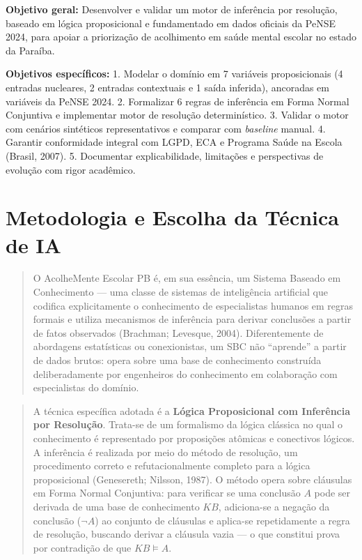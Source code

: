\documentclass[11pt]{article}
\begin{document}
\textbf{Objetivo geral:} Desenvolver e validar um motor de inferência
por resolução, baseado em lógica proposicional e fundamentado em dados
oficiais da PeNSE 2024, para apoiar a priorização de acolhimento em
saúde mental escolar no estado da Paraíba.

\textbf{Objetivos específicos:} 1. Modelar o domínio em 7 variáveis
proposicionais (4 entradas nucleares, 2 entradas contextuais e 1 saída
inferida), ancoradas em variáveis da PeNSE 2024. 2. Formalizar 6 regras
de inferência em Forma Normal Conjuntiva e implementar motor de
resolução determinístico. 3. Validar o motor com cenários sintéticos
representativos e comparar com \emph{baseline} manual. 4. Garantir
conformidade integral com LGPD, ECA e Programa Saúde na Escola (Brasil,
2007). 5. Documentar explicabilidade, limitações e perspectivas de
evolução com rigor acadêmico.

    \section{Metodologia e Escolha da Técnica de
IA}\label{metodologia-e-escolha-da-tuxe9cnica-de-ia}

\begin{quote}
O AcolheMente Escolar PB é, em sua essência, um Sistema Baseado em
Conhecimento --- uma classe de sistemas de inteligência artificial que
codifica explicitamente o conhecimento de especialistas humanos em
regras formais e utiliza mecanismos de inferência para derivar
conclusões a partir de fatos observados (Brachman; Levesque, 2004).
Diferentemente de abordagens estatísticas ou conexionistas, um SBC não
``aprende'' a partir de dados brutos: opera sobre uma base de
conhecimento construída deliberadamente por engenheiros do conhecimento
em colaboração com especialistas do domínio.
\end{quote}

\begin{quote}
A técnica específica adotada é a \textbf{Lógica Proposicional com
Inferência por Resolução}. Trata-se de um formalismo da lógica clássica
no qual o conhecimento é representado por proposições atômicas e
conectivos lógicos. A inferência é realizada por meio do método de
resolução, um procedimento correto e refutacionalmente completo para a
lógica proposicional (Genesereth; Nilsson, 1987). O método opera sobre
cláusulas em Forma Normal Conjuntiva: para verificar se uma conclusão
\(A\) pode ser derivada de uma base de conhecimento \(KB\), adiciona-se
a negação da conclusão (\(\neg A\)) ao conjunto de cláusulas e aplica-se
repetidamente a regra de resolução, buscando derivar a cláusula vazia
--- o que constitui prova por contradição de que \(KB \models A\).
\end{quote}
\end{document}
